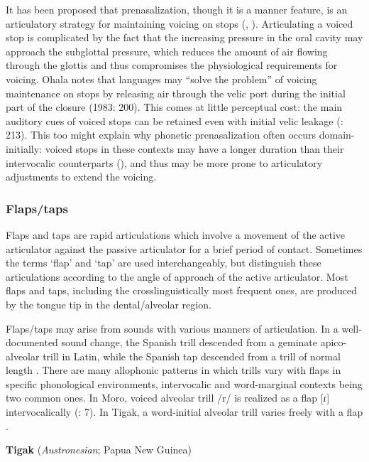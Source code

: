   It has been proposed that prenasalization, though it is a manner feature, is an articulatory strategy for maintaining voicing on stops (\citealt{Ohala1983}, \citealt{HentonEtAl1992}). Articulating a voiced stop is complicated by the fact that the increasing pressure in the oral cavity may approach the subglottal pressure, which reduces the amount of air flowing through the glottis and thus compromises the physiological requirements for voicing. Ohala notes that languages may “solve the problem” of voicing maintenance on stops by releasing air through the velic port during the initial part of the closure (1983: 200). This comes at little perceptual cost: the main auditory cues of voiced stops can be retained even with initial velic leakage (\citealt{OhalaOhala1991}: 213). This too might explain why phonetic prenasalization often occurs domain-initially: voiced stops in these contexts may have a longer duration than their intervocalic counterparts (\citealt{FlegeBrown1982}), and thus may be more prone to articulatory adjustments to extend the voicing.

\subsubsection{{Flaps/taps} }\label{sec:4.5.3.2}

  Flaps and taps are rapid articulations which involve a movement of the active articulator against the passive articulator for a brief period of contact. Sometimes the terms ‘flap’ and ‘tap’ are used interchangeably, but \citet{LadefogedMaddieson1996} distinguish these articulations according to the angle of approach of the active articulator. Most flaps and taps, including the crosslinguistically most frequent ones, are produced by the tongue tip in the dental/alveolar region.

  Flaps/taps may arise from sounds with various manners of articulation. In a well-documented sound change, the Spanish trill descended from a geminate apico-alveolar trill in Latin, while the Spanish tap descended from a trill of normal length \citep[17-18]{Hualde2004}. There are many allophonic patterns in which trills vary with flaps in specific phonological environments, intervocalic and word-marginal contexts being two common ones. In Moro, voiced alveolar trill /r/ is realized as a flap [ɾ] intervocalically (\citealt{BlackBlack1971}: 7). In Tigak, a word-initial alveolar trill varies freely with a flap .

\ea\label{ex:(4.52)}
  \textbf{Tigak} (\textit{Austronesian}; Papua New Guinea)

